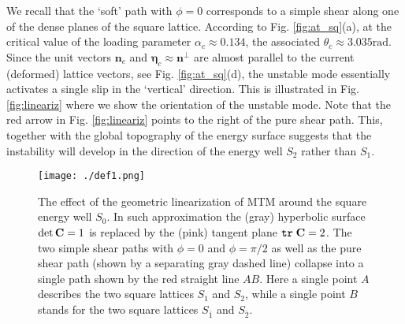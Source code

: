 \documentclass[CRPHYS,Unicode,manuscript]{cedram}
\def\tr{{\tt tr}\hspace{1mm}}
\begin{document}
We recall that the  `soft'  path  with $\phi=0$ corresponds to a simple shear along one of the dense planes of the square lattice.  According to Fig. \ref{fig:at_sq}(a), at the critical value of the loading parameter $\alpha_c \approx  0.134$,  the associated $\theta_c\approx 3.035\text{rad}$. Since the unit  vectors  $  \pmb{n}_c $ and $ \pmb{\eta}_c \approx \pmb{n}^\perp$ are almost parallel  to the current (deformed)  lattice vectors, see Fig. \ref{fig:at_sq}(d),  the unstable mode   essentially activates a   single slip in the `vertical' direction. This is illustrated in Fig. \ref{fig:lineariz} where we show the orientation  of the   unstable mode.   Note  that  the red arrow in Fig. \ref{fig:lineariz} points to the right of the pure shear path.  This, together with  the global topography of the energy surface suggests that the instability will develop in the direction of the energy well $S_2$ rather than $S_1$.

\begin{figure}[h!]
\centering
\texttt{[image: ./def1.png]}
\caption{\scriptsize {The effect of the geometric linearization of MTM around  the square energy well $S_0$. In such  approximation the (gray)  hyperbolic surface  $\det{\bold C}=1$ is replaced by the (pink) tangent plane $\tr {\bf C}=2$. The two simple shear paths with $\phi=0$ and $\phi=\pi/2$ as well as the pure shear path (shown by a separating gray dashed line) collapse into a single  path shown by the red straight line $AB$. Here a single point $A$ describes the two  square lattices $S_1$ and $S_2$, while a single  point $B$ stands for  the two  square lattices $S_{\bar1}$ and $S_{\bar 2}$}.
\label{fig:corr}}
\end{figure}
\end{document}
